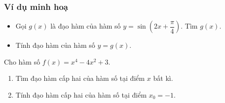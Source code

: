 \subsubsection{Ví dụ minh hoạ}
\begin{vd}%
	\begin{itemize}
		\item Gọi $g(x)$ là đạo hàm của hàm số $y=\sin \left(2x+\dfrac{\pi}{4}\right)$. Tìm $g(x)$.
		\item Tính đạo hàm của hàm số $y=g(x)$.
	\end{itemize}
\end{vd}
\begin{vd}%
	Cho hàm số $ f(x)=x^{4}-4x^{2}+3 $.
	\begin{enumerate}
		\item Tìm đạo hàm cấp hai của hàm số tại điểm $ x $ bất kì.
		\item Tính đạo hàm cấp hai của hàm số tại điểm $ x_{0}=-1 $.
	\end{enumerate}
\end{vd}
